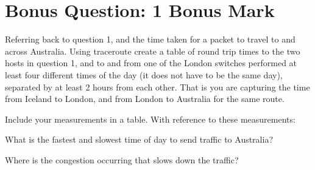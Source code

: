 \documentclass[9pt, addpoints]{exam}
\begin{document}
\begin{questions}

\end{questions}
 \section*{Bonus Question: 1 Bonus Mark}

 Referring back to question 1, and the time taken for a packet to travel
 to and across Australia.  Using traceroute create a table of round trip 
 times to the two hosts in question 1, and to and from one of the London 
 switches performed at least four different times of the day (it does not
 have to be the same day), separated by at least 2 hours
 from each other. That is you are capturing the time from Iceland to London,
 and from London to Australia for the same route.

 \vspace{18pt}
 Include your measurements in a table. With reference to these measurements:
 \vspace{18pt}

 What is the fastest and slowest time of day to send traffic to Australia?
 
 \vspace{18pt}

 Where is the congestion occurring that slows down the traffic?
\end{document}
